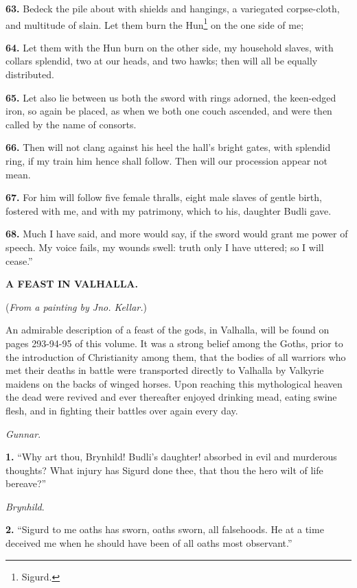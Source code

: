 \textbf{63.} Bedeck the pile about with shields and hangings, a variegated
corpse-cloth, and multitude of slain. Let them burn the Hun\footnote{Sigurd.} on the
one side of me;

\textbf{64.} Let them with the Hun burn on the other side, my household
slaves, with collars splendid, two at our heads, and two hawks; then
will all be equally distributed.

\textbf{65.} Let also lie between us both the sword with rings adorned, the
keen-edged iron, so again be placed, as when we both one couch
ascended, and were then called by the name of consorts.

\textbf{66.} Then will not clang against his heel the hall's bright gates,
with splendid ring, if my train him hence shall follow. Then will our
procession appear not mean.

\textbf{67.} For him will follow five female thralls, eight male slaves of
gentle birth, fostered with me, and with my patrimony, which to his,
daughter Budli gave.

\textbf{68.} Much I have said, and more would say, if the sword would grant
me power of speech. My voice fails, my wounds swell: truth only I have
uttered; so I will cease.''

\textbf{A FEAST IN VALHALLA.}

(\emph{From a painting by Jno. Kellar.})

An admirable description of a feast of the gods, in Valhalla, will be
found on pages 293-94-95 of this volume. It was a strong belief among
the Goths, prior to the introduction of Christianity among them, that
the bodies of all warriors who met their deaths in battle were
transported directly to Valhalla by Valkyrie maidens on the backs of
winged horses. Upon reaching this mythological heaven the dead were
revived and ever thereafter enjoyed drinking mead, eating swine flesh,
and in fighting their battles over again every day.


\emph{Gunnar}.

\textbf{1.} ``Why art thou, Brynhild! Budli's daughter! absorbed in evil and
murderous thoughts? What injury has Sigurd done thee, that thou the
hero wilt of life bereave?''

\emph{Brynhild}.

\textbf{2.} ``Sigurd to me oaths has sworn, oaths sworn, all falsehoods. He at
a time deceived me when he should have been of all oaths most
observant.''

